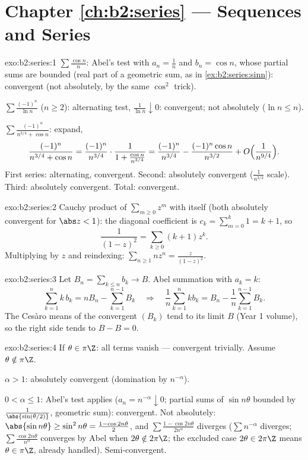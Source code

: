 \section*{Chapter \ref{ch:b2:series} --- Sequences and Series}

\begin{solution}{exo:b2:series:1}
$\sum\frac{\cos n}{n}$: Abel's test with $a_n = \frac1n$ and $b_n =
\cos n$, whose partial sums are bounded (real part of a geometric
sum, as in \cref{ex:b2:series:sinn}): convergent (not absolutely,
by the same $\cos^2$ trick).

$\sum \frac{(-1)^n}{\ln n}$ ($n \geq 2$): alternating test,
$\frac{1}{\ln n} \downarrow 0$: convergent; not absolutely ($\ln n
\leq n$).

$\sum \frac{(-1)^n}{n^{3/4} + \cos n}$: expand,
\[
\frac{(-1)^n}{n^{3/4} + \cos n}
= \frac{(-1)^n}{n^{3/4}}\cdot
\frac{1}{1 + \frac{\cos n}{n^{3/4}}}
= \frac{(-1)^n}{n^{3/4}}
- \frac{(-1)^n\cos n}{n^{3/2}} + O\Bigl(\frac{1}{n^{9/4}}\Bigr).
\]
First series: alternating, convergent. Second: absolutely
convergent ($\frac{1}{n^{3/2}}$ scale). Third: absolutely
convergent. Total: convergent.
\end{solution}

\begin{solution}{exo:b2:series:2}
Cauchy product of $\sum_{m\geq0} z^m$ with itself (both absolutely
convergent for $\abs z < 1$): the diagonal coefficient is $c_k =
\sum_{m=0}^{k} 1 = k + 1$, so
\[
\frac{1}{(1-z)^2} = \sum_{k\geq0} (k+1)z^k .
\]
Multiplying by $z$ and reindexing: $\sum_{n \geq 1} n z^n =
\frac{z}{(1-z)^2}$.
\end{solution}

\begin{solution}{exo:b2:series:3}
Let $B_n = \sum_{k \leq n} b_k \to B$. Abel summation with $a_k = k$:
\[
\sum_{k=1}^{n} k\,b_k = n B_n - \sum_{k=1}^{n-1} B_k
\quad\Longrightarrow\quad
\frac1n \sum_{k=1}^{n} k b_k = B_n - \frac{1}{n}\sum_{k=1}^{n-1}
B_k .
\]
The Ces\`aro means of the convergent $(B_k)$ tend to its limit $B$
(Year 1 volume), so the right side tends to $B - B = 0$.
\end{solution}

\begin{solution}{exo:b2:series:4}
If $\theta \in \pi\Z$: all terms vanish --- convergent trivially.
Assume $\theta \notin \pi\Z$.

$\alpha > 1$: absolutely convergent (domination by $n^{-\alpha}$).

$0 < \alpha \leq 1$: Abel's test applies ($a_n = n^{-\alpha}
\downarrow 0$; partial sums of $\sin n\theta$ bounded by
$\frac{1}{\abs{\sin(\theta/2)}}$, geometric sum): convergent. Not
absolutely: $\abs{\sin n\theta} \geq \sin^2 n\theta = \frac{1 -
\cos 2n\theta}{2}$, and $\sum \frac{1 - \cos 2n\theta}{2n^\alpha}$
diverges ($\sum n^{-\alpha}$ diverges; $\sum
\frac{\cos 2n\theta}{n^\alpha}$ converges by Abel when $2\theta
\notin 2\pi\Z$; the excluded case $2\theta \in 2\pi\Z$ means
$\theta \in \pi\Z$, already handled). Semi-convergent.
\end{solution}

